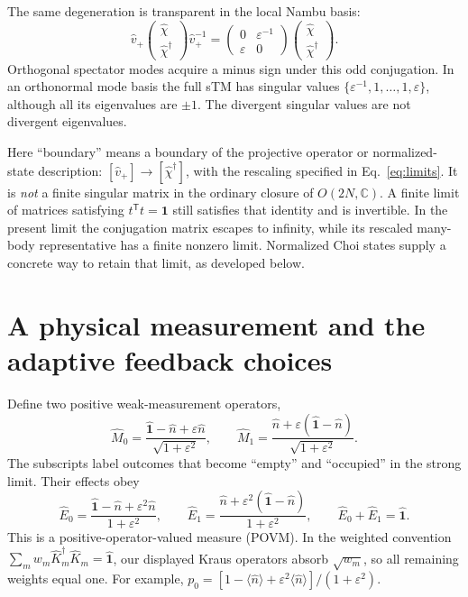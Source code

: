 \documentclass[aps,prb,onecolumn,nofootinbib,superscriptaddress]{revtex4-2}
\newcommand{\One}{\hat{\mathbf{1}}}
\newcommand{\Id}{\mathbf{1}}
\newcommand{\eps}{\varepsilon}
\begin{document}
The same degeneration is transparent in the local Nambu basis:
\begin{equation}
 \hat v_+\begin{pmatrix}\hat\chi\\\hat\chi^\dagger\end{pmatrix}\hat v_+^{-1}
 =\begin{pmatrix}0&\eps^{-1}\\\eps&0\end{pmatrix}
 \begin{pmatrix}\hat\chi\\\hat\chi^\dagger\end{pmatrix}.
 \label{eq:nambu}
\end{equation}
Orthogonal spectator modes acquire a minus sign under this odd
conjugation. In an orthonormal mode basis the full sTM has singular values
$\{\eps^{-1},1,\ldots,1,\eps\}$, although all its eigenvalues are $\pm1$.
The divergent singular values are not divergent eigenvalues.

Here ``boundary'' means a boundary of the projective operator or
normalized-state description: $[\hat v_+]\to[\hat\chi^\dagger]$, with
the rescaling specified in Eq.~\eqref{eq:limits}. It is \emph{not} a finite
singular matrix in the ordinary closure of $O(2N,\mathbb C)$. A finite
limit of matrices satisfying $t^{\mathsf T}t=\Id$ still satisfies that
identity and is invertible. In the present limit the conjugation matrix
escapes to infinity, while its rescaled many-body representative has a
finite nonzero limit. Normalized Choi states supply a concrete way to
retain that limit, as developed below.

\section{A physical measurement and the adaptive feedback choices}
Define two positive weak-measurement operators,
\begin{equation}
 \hat M_0=\frac{\One-\hat n+\eps\hat n}{\sqrt{1+\eps^2}},\qquad
 \hat M_1=\frac{\hat n+\eps(\One-\hat n)}{\sqrt{1+\eps^2}}.
 \label{eq:weak-measurement}
\end{equation}
The subscripts label outcomes that become ``empty'' and ``occupied'' in
the strong limit. Their effects obey
\begin{equation}
 \hat E_0=\frac{\One-\hat n+\eps^2\hat n}{1+\eps^2},\qquad
 \hat E_1=\frac{\hat n+\eps^2(\One-\hat n)}{1+\eps^2},\qquad
 \hat E_0+\hat E_1=\One.
 \label{eq:effects}
\end{equation}
This is a positive-operator-valued measure (POVM). In the weighted
convention $\sum_m w_m\hat K_m^\dagger\hat K_m=\One$, our displayed
Kraus operators absorb $\sqrt{w_m}$, so all remaining weights equal one.
For example,
$p_0=[1-\langle\hat n\rangle+\eps^2\langle\hat n\rangle]/(1+\eps^2)$.
\end{document}
